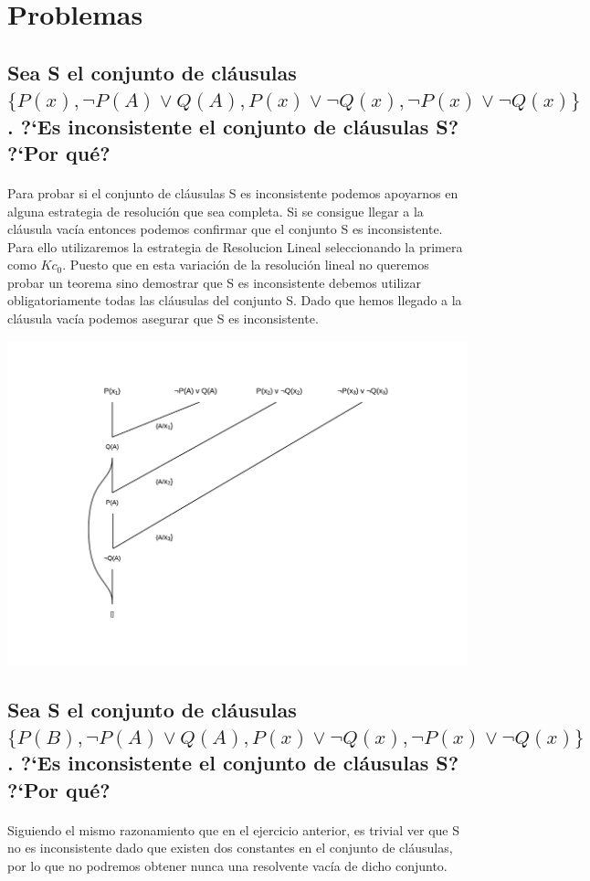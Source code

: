 \documentclass[10pt, a4paper,spanish]{article}
\begin{document}
	\newpage
	\section{Problemas}

		\subsection{Sea S el conjunto de cláusulas $ \{ P(x), \lnot P(A) \lor Q(A), P(x) \lor \lnot Q(x), \lnot P(x) \lor \lnot Q(x) \} $. ?`Es inconsistente el conjunto de cláusulas S? ?`Por qué?}

			\paragraph{}
			Para probar si el conjunto de cláusulas S es inconsistente podemos apoyarnos en alguna estrategia de resolución que sea completa. Si se consigue llegar a la cláusula vacía entonces podemos confirmar que el conjunto S es inconsistente. Para ello utilizaremos la estrategia de Resolucion Lineal seleccionando la primera como $Kc_0$. Puesto que en esta variación de la resolución lineal no queremos probar un teorema sino demostrar que S es inconsistente debemos utilizar obligatoriamente todas las cláusulas del conjunto S. Dado que hemos llegado a la cláusula vacía podemos asegurar que S es inconsistente.

			\includegraphics[width=\textwidth]{problem-1-resolution}


		\subsection{Sea S el conjunto de cláusulas $ \{ P(B), \lnot P(A) \lor Q(A), P(x) \lor \lnot Q(x), \lnot P(x) \lor \lnot Q(x) \} $. ?`Es inconsistente el conjunto de cláusulas S? ?`Por qué?}

			\paragraph{}
			Siguiendo el mismo razonamiento que en el ejercicio anterior, es trivial ver que S no es inconsistente dado que existen dos constantes en el conjunto de cláusulas, por lo que no podremos obtener nunca una resolvente vacía de dicho conjunto.
\end{document}
